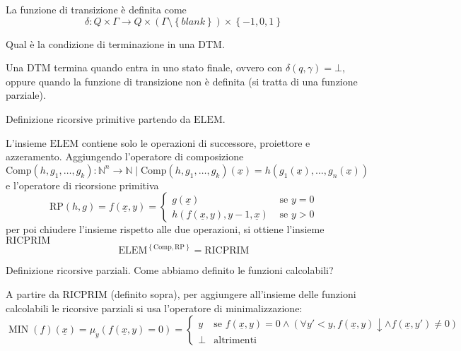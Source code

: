 \documentclass[12pt, answers]{exam}
\theoremstyle{plain}
\DeclareMathOperator{\MIN}{MIN}
\newcommand{\elem}{\text{ELEM}}
\newcommand{\comp}{\text{Comp}}
\newcommand{\rp}{\text{RP}}
\newcommand{\ricprim}{\text{RICPRIM}}
\newcommand{\N}{\mathbb{N}}
\begin{document}
\begin{questions}
\begin{solution}
            La funzione di transizione è definita come
            $$ \delta: Q \times \Gamma \rightarrow Q \times (\Gamma \setminus \left\{ blank \right\}) \times \left\{-1, 0, 1\right\} $$
        \end{solution}
        
        \question Qual è la condizione di terminazione in una DTM.
        
        \begin{solution}
            Una DTM termina quando entra in uno stato finale, ovvero con $\delta (q, \gamma) = \bot$, oppure quando la funzione di transizione non è definita (si tratta di una funzione parziale).
        \end{solution}
        
        \question Definizione ricorsive primitive partendo da $\elem$.
        
        \begin{solution}
            L'insieme $\elem$ contiene solo le operazioni di successore, proiettore e azzeramento. Aggiungendo l'operatore di composizione 
            $$ \comp (h, g_1, \dots, g_k): \N^n \rightarrow \N \mid \comp (h, g_1, \dots, g_k) (\underline{x}) = h(g_1 (\underline{x}), \dots, g_n (\underline{x})) $$
            e l'operatore di ricorsione primitiva
            $$ \rp (h, g) = f(\underline{x}, y) = \begin{cases}
                g(\underline{x}) & \text{ se } y = 0 \\
                h(f(\underline{x}, y), y-1, \underline{x}) & \text{ se } y > 0 
            \end{cases}$$
            per poi chiudere l'insieme rispetto alle due operazioni, si ottiene l'insieme $\ricprim$
            $$ \elem^{\left\{\comp, \rp\right\}} = \ricprim $$
        \end{solution}
        
        \question Definizione ricorsive parziali. Come abbiamo definito le funzioni calcolabili?
        
        \begin{solution}
            A partire da $\ricprim$ (definito sopra), per aggiungere all'insieme delle funzioni calcolabili le ricorsive parziali si usa l'operatore di minimalizzazione: 
            $$ \MIN (f) (\underline{x}) = \mu_y (f(\underline{x}, y) = 0) = \begin{cases}
                y & \text{se } f(\underline{x}, y) = 0 \wedge (\forall y' < y, f(\underline{x}, y) \downarrow \wedge f(\underline{x}, y') \neq 0) \\
                \bot & \text{altrimenti}
            \end{cases} $$
            

\end{solution}
\end{questions}
\end{document}
